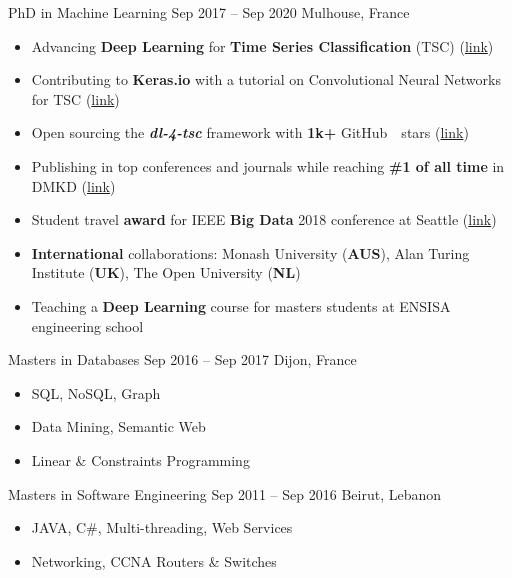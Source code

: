 
 {PhD in Machine Learning} {Sep 2017 -- Sep 2020} {Mulhouse, France} 

\begin{itemize}
    \item Advancing \textbf{Deep Learning} for \textbf{Time Series Classification} (TSC) (\href{https://github.com/hfawaz/}{link})
    \item Contributing to \textbf{Keras.io} with a tutorial on Convolutional Neural Networks for TSC (\href{https://keras.io/examples/timeseries/timeseries_classification_from_scratch/}{link})
    \item Open sourcing the \textbf{\textit{dl-4-tsc}} framework with \textbf{1k+} GitHub~\githubsymbol~stars (\href{https://github.com/hfawaz/dl-4-tsc/}{link})
    \item Publishing in top conferences and journals while reaching \textbf{\#1 of all time} in DMKD (\href{https://scholar.google.com/citations?hl=en&vq=eng_datamininganalysis&view_op=list_hcore&venue=35Y8BTagp0QJ.2022}{link})
    \item Student travel \textbf{award} for IEEE \textbf{Big Data} 2018 conference at Seattle (\href{http://cci.drexel.edu/bigdata/bigdata2018/StudentTravelAward.html}{link})
    \item \textbf{International} collaborations: Monash University (\textbf{AUS}), Alan Turing Institute (\textbf{UK}), The Open University (\textbf{NL})
    \item Teaching a \textbf{Deep Learning} course for masters students at ENSISA engineering school
\end{itemize}

\divider

 {Masters in Databases} {Sep 2016 -- Sep 2017} {Dijon, France} 
\begin{itemize}
    \item SQL, NoSQL, Graph
    \item Data Mining, Semantic Web
    \item Linear \& Constraints Programming
\end{itemize}

\divider

 {Masters in Software Engineering} {Sep 2011 -- Sep 2016} {Beirut, Lebanon} 
\begin{itemize}
    \item JAVA, C\#, Multi-threading, Web Services
    \item Networking, CCNA Routers \& Switches
\end{itemize}

